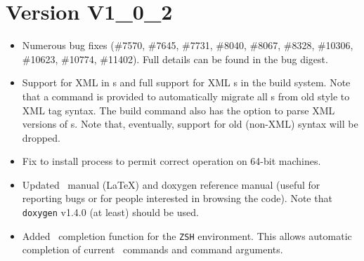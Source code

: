\section{Version V1\_0\_2}
\begin{itemize}
\item Numerous bug fixes (\#7570, \#7645, \#7731, \#8040,
  \#8067, \#8328, \#10306, \#10623, \#10774, \#11402). Full details
  can be found in the bug digest.

\item Support for XML in \buildfile s and full support for XML
  \buildfile s in the build system. Note that a command is
  provided to automatically migrate all \buildfile s from old 
  style to XML tag syntax. The build command also has the option to parse XML
  versions of \buildfile s. Note that, eventually, support for
  old (non-XML) syntax will be dropped.
  
\item Fix to install process to permit correct operation on 64-bit machines.
  
\item Updated \scram\ manual (\LaTeX) and doxygen reference manual
  (useful for reporting bugs or for people interested in
  browsing the code). Note that \texttt{doxygen} v1.4.0 (at least) should
  be used. 
  
\item Added \scram\ completion function for the \texttt{ZSH}
  environment. This allows automatic completion of current
  \scram\ commands and command arguments.
  
\end{itemize}



